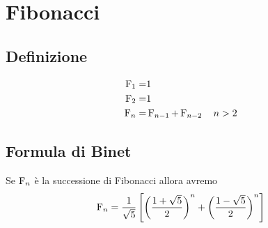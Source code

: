 \chapter{Fibonacci}
\section{Definizione}
\begin{defn}
	\begin{align*}
		\operatorname{F}_{1}=&1\\
		\operatorname{F}_{2}=&1\\
		\operatorname{F}_{n}=&\operatorname{F}_{n-1}+\operatorname{F}_{n-2}\quad n>2
	\end{align*}
\end{defn}
\section{Formula di Binet}
\begin{thm}
	Se $\operatorname{F}_{n}$ è la successione di Fibonacci allora avremo
	\[\operatorname{F}_{n}=\dfrac{1}{\sqrt{5}}\left[\left(\dfrac{1+\sqrt{5}}{2}\right)^n+\left(\dfrac{1-\sqrt{5}}{2}\right)^n\right] \]
\end{thm}